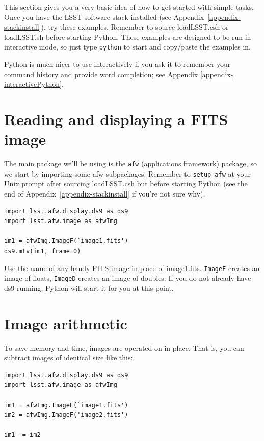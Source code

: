 This section gives you a very basic idea of how to get started with
simple tasks.  Once you have the LSST software stack installed (see
Appendix~\ref{appendix-stackinstall}), try these examples.  Remember
to source loadLSST.csh or loadLSST.sh before starting Python.  These
examples are designed to be run in interactive mode, so just type
\texttt{python} to start and copy/paste the examples in.

Python is much nicer to use interactively if you ask it to remember your command history and provide word completion; see Appendix \ref{appendix-interactivePython}.

\section{Reading and displaying a FITS image}

The main package we'll be using is the \texttt{afw} (applications
framework) package, so we start by importing some afw subpackages.
Remember to \texttt{setup afw} at your Unix prompt after sourcing
loadLSST.csh but before starting Python (see the end of
Appendix~\ref{appendix-stackinstall} if you're not sure why).

\begin{verbatim}
import lsst.afw.display.ds9 as ds9
import lsst.afw.image as afwImg

im1 = afwImg.ImageF(`image1.fits')
ds9.mtv(im1, frame=0)
\end{verbatim}

Use the name of any handy FITS image in place of image1.fits.
\texttt{ImageF} creates an image of floats, \texttt{ImageD} creates an
image of doubles.  If you do not already have ds9 running, Python will
start it for you at this point.

\section{Image arithmetic}

To save memory and time, images are operated on in-place.  That is,
you can subtract images of identical size like this:

\begin{verbatim}
import lsst.afw.display.ds9 as ds9
import lsst.afw.image as afwImg

im1 = afwImg.ImageF(`image1.fits')
im2 = afwImg.ImageF('image2.fits')

im1 -= im2
\end{verbatim}

